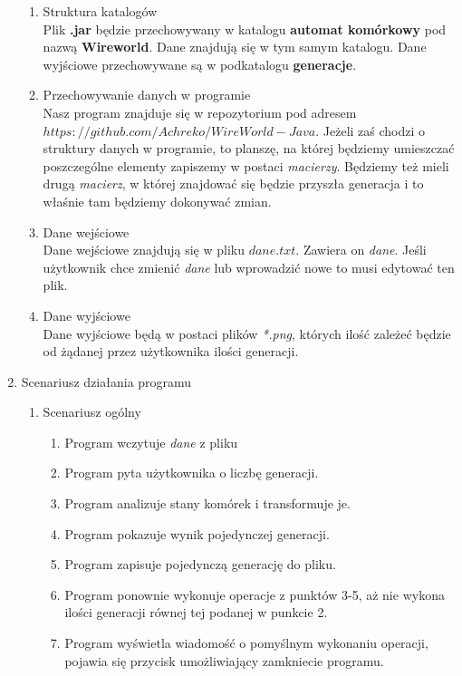 \documentclass[11pt]{article}
\begin{document}
\begin{enumerate}
\begin{enumerate}[label=\arabic{enumi}.\arabic*.]
 \item Struktura katalogów\\
 Plik \textbf{.jar} będzie przechowywany w katalogu \textbf{automat komórkowy} pod nazwą \textbf{Wireworld}. Dane znajdują się w tym samym katalogu. Dane wyjściowe przechowywane są w podkatalogu \textbf{generacje}.
 \item Przechowywanie danych w programie\\
 Nasz program znajduje się w repozytorium pod adresem $https://github.com/Achreko/WireWorld-Java$. Jeżeli zaś chodzi o struktury danych w programie, to planszę, na której będziemy umieszczać poszczególne elementy zapiszemy w postaci \textit{macierzy}. Będziemy też mieli drugą \textit{macierz}, w której znajdować się będzie przyszła generacja i to właśnie tam będziemy dokonywać zmian.\\
 \item Dane wejściowe\\
 Dane wejściowe znajdują się w pliku $dane.txt$. Zawiera on \textit{dane}.
 Jeśli użytkownik chce zmienić \textit{dane} lub wprowadzić nowe to musi edytować ten plik.\\
 \item Dane wyjściowe\\
 Dane wyjściowe będą w postaci plików \textit{*.png}, których ilość zależeć będzie od żądanej przez użytkownika ilości generacji.
 \end{enumerate}
 

\item Scenariusz działania programu


\begin{enumerate}[label=\arabic{enumi}.\arabic*.]
\item Scenariusz ogólny
\begin{enumerate}[label*=\arabic*.]
\item Program wczytuje \textit{dane} z pliku 
\item Program pyta użytkownika o liczbę generacji.
\item Program analizuje stany komórek i transformuje je.
\item Program pokazuje wynik pojedynczej generacji.
\item Program zapisuje pojedynczą generację do pliku.
\item Program ponownie wykonuje operacje z punktów 3-5, aż nie wykona ilości generacji równej tej 		podanej w punkcie 2.
\item Program wyświetla wiadomość o pomyślnym wykonaniu operacji, pojawia się przycisk umożliwiający zamkniecie programu.\\
\end{enumerate}




\end{enumerate}
\end{enumerate}
\end{document}
